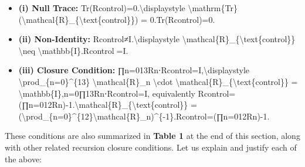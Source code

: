\documentclass[
]{article}
\begin{document}
\begin{itemize}
\item
  \textbf{(i) Null Trace:} Tr(Rcontrol)=0.\textbackslash displaystyle
  \textbackslash mathrm\{Tr\}(\textbackslash mathcal\{R\}\_\{\textbackslash text\{control\}\})
  = 0.Tr(Rcontrol\hspace{0pt})=0.
\item
  \textbf{(ii) Non-Identity:} Rcontrol≠I.\textbackslash displaystyle
  \textbackslash mathcal\{R\}\_\{\textbackslash text\{control\}\}
  \textbackslash neq \textbackslash mathbb\{I\}.Rcontrol\hspace{0pt}=I.
\item
  \textbf{(iii) Closure Condition:}
  ∏n=013Rn⋅Rcontrol=I,\textbackslash displaystyle
  \textbackslash prod\_\{n=0\}\^{}\{13\} \textbackslash mathcal\{R\}\_n
  \textbackslash cdot
  \textbackslash mathcal\{R\}\_\{\textbackslash text\{control\}\} =
  \textbackslash mathbb\{I\},n=0∏13\hspace{0pt}Rn\hspace{0pt}⋅Rcontrol\hspace{0pt}=I,
  equivalently
  Rcontrol=(∏n=012Rn)-1.\textbackslash mathcal\{R\}\_\{\textbackslash text\{control\}\}
  =
  (\textbackslash prod\_\{n=0\}\^{}\{12\}\textbackslash mathcal\{R\}\_n)\^{}\{-1\}.Rcontrol\hspace{0pt}=(∏n=012\hspace{0pt}Rn\hspace{0pt})-1.
\end{itemize}

These conditions are also summarized in \textbf{Table 1} at the end of
this section, along with other related recursion closure conditions. Let
us explain and justify each of the above:
\end{document}
